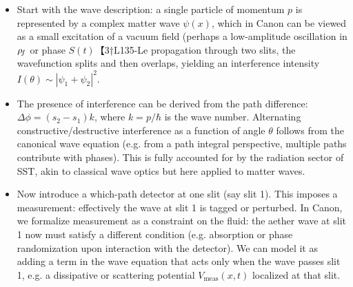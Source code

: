 \documentclass[11pt]{article}
\begin{document}
\begin{itemize}

\item 
Start with the wave description: a single particle of momentum $p$ is represented by a complex matter wave $\psi(x)$, which in Canon can be viewed as a small excitation of a vacuum field (perhaps a low-amplitude oscillation in $\rho_{\!f}$ or phase $S(t)$【3†L135-Le propagation through two slits, the wavefunction splits and then overlaps, yielding an interference intensity $I(\theta) \sim |\psi_1 + \psi_2|^2$.




\item 
The presence of interference can be derived from the path difference: $\Delta \phi = (s_2 - s_1) k$, where $k=p/\hbar$ is the wave number. Alternating constructive/destructive interference as a function of angle $\theta$ follows from the canonical wave equation (e.g. from a path integral perspective, multiple paths contribute with phases). This is fully accounted for by the radiation sector of SST, akin to classical wave optics but here applied to matter waves.




\item 
Now introduce a which-path detector at one slit (say slit 1). This imposes a measurement: effectively the wave at slit 1 is tagged or perturbed. In Canon, we formalize measurement as a constraint on the fluid: the aether wave at slit 1 now must satisfy a different condition (e.g. absorption or phase randomization upon interaction with the detector). We can model it as adding a term in the wave equation that acts only when the wave passes slit 1, e.g. a dissipative or scattering potential $V_{\text{meas}}(x,t)$ localized at that slit.





\end{itemize}
\end{document}
